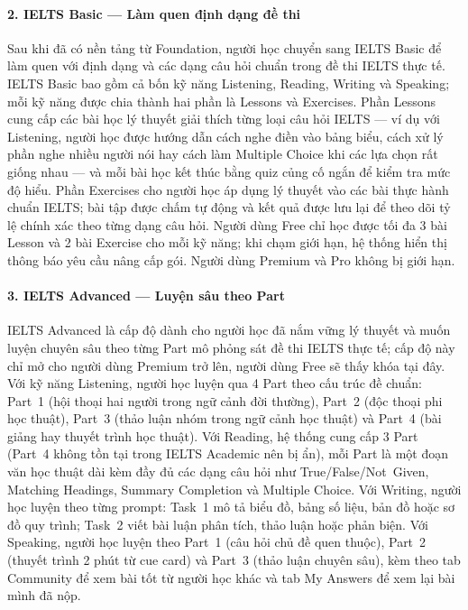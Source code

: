 \paragraph{2. IELTS Basic --- Làm quen định dạng đề thi}

Sau khi đã có nền tảng từ Foundation, người học chuyển sang IELTS Basic để làm quen với định dạng và các dạng câu hỏi chuẩn trong đề thi IELTS thực tế. IELTS Basic bao gồm cả bốn kỹ năng Listening, Reading, Writing và Speaking; mỗi kỹ năng được chia thành hai phần là Lessons và Exercises. Phần Lessons cung cấp các bài học lý thuyết giải thích từng loại câu hỏi IELTS --- ví dụ với Listening, người học được hướng dẫn cách nghe điền vào bảng biểu, cách xử lý phần nghe nhiều người nói hay cách làm Multiple Choice khi các lựa chọn rất giống nhau --- và mỗi bài học kết thúc bằng quiz củng cố ngắn để kiểm tra mức độ hiểu. Phần Exercises cho người học áp dụng lý thuyết vào các bài thực hành chuẩn IELTS; bài tập được chấm tự động và kết quả được lưu lại để theo dõi tỷ lệ chính xác theo từng dạng câu hỏi. Người dùng Free chỉ học được tối đa 3 bài Lesson và 2 bài Exercise cho mỗi kỹ năng; khi chạm giới hạn, hệ thống hiển thị thông báo yêu cầu nâng cấp gói. Người dùng Premium và Pro không bị giới hạn.

\paragraph{3. IELTS Advanced --- Luyện sâu theo Part}

IELTS Advanced là cấp độ dành cho người học đã nắm vững lý thuyết và muốn luyện chuyên sâu theo từng Part mô phỏng sát đề thi IELTS thực tế; cấp độ này chỉ mở cho người dùng Premium trở lên, người dùng Free sẽ thấy khóa tại đây. Với kỹ năng Listening, người học luyện qua 4 Part theo cấu trúc đề chuẩn: Part~1 (hội thoại hai người trong ngữ cảnh đời thường), Part~2 (độc thoại phi học thuật), Part~3 (thảo luận nhóm trong ngữ cảnh học thuật) và Part~4 (bài giảng hay thuyết trình học thuật). Với Reading, hệ thống cung cấp 3 Part (Part~4 không tồn tại trong IELTS Academic nên bị ẩn), mỗi Part là một đoạn văn học thuật dài kèm đầy đủ các dạng câu hỏi như True/False/Not~Given, Matching Headings, Summary Completion và Multiple Choice. Với Writing, người học luyện theo từng prompt: Task~1 mô tả biểu đồ, bảng số liệu, bản đồ hoặc sơ đồ quy trình; Task~2 viết bài luận phân tích, thảo luận hoặc phản biện. Với Speaking, người học luyện theo Part~1 (câu hỏi chủ đề quen thuộc), Part~2 (thuyết trình 2 phút từ cue card) và Part~3 (thảo luận chuyên sâu), kèm theo tab Community để xem bài tốt từ người học khác và tab My Answers để xem lại bài mình đã nộp.

